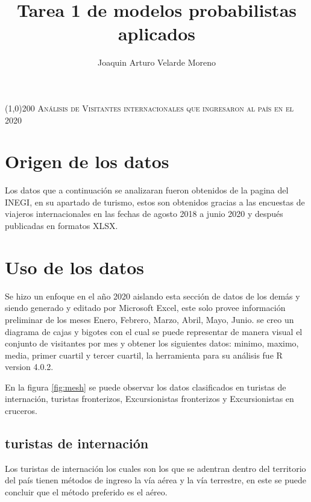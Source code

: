 \documentclass[]{article}
\title{Tarea 1 de modelos probabilistas aplicados}
\author{Joaquin Arturo Velarde Moreno}
\date{}
\begin{document}
	\maketitle
	\begin{center}
		\line(1,0){200}
		\linebreak
		\linebreak
		\linebreak
		\textsc{\Large Análisis de Visitantes internacionales que ingresaron al país en el 2020}
	
	\end{center}

\section{Origen de los datos}
	Los datos que a continuación se analizaran fueron obtenidos de la pagina del INEGI\cite{inegi}, en su apartado de turismo, estos son obtenidos gracias a las encuestas de viajeros internacionales en las fechas de agosto 2018 a junio 2020 y después publicadas en formatos XLSX.
	
	\section{Uso de los datos}
	
	Se hizo un enfoque en el año 2020 aislando esta sección de datos de los demás y siendo generado y editado por Microsoft Excel\cite{excel}, este solo provee información preliminar de los meses Enero, Febrero, Marzo, Abril, Mayo, Junio. 
	\linebreak
	se creo un diagrama de cajas y bigotes con el cual se puede representar de manera visual el conjunto de visitantes por mes y obtener los siguientes datos: minimo, maximo, media, primer cuartil y tercer cuartil, la herramienta para su análisis fue R version 4.0.2\cite{rproject}.

	En la figura \ref{fig:mesh} se puede observar los datos clasificados en turistas de internación, turistas fronterizos, Excursionistas fronterizos y Excursionistas en cruceros.

	\subsection{turistas de internación}
Los turistas de internación los cuales son los que se adentran dentro del territorio del país tienen métodos de ingreso la vía aérea y la vía terrestre, en este se puede concluir que el método preferido es el aéreo.
\end{document}
